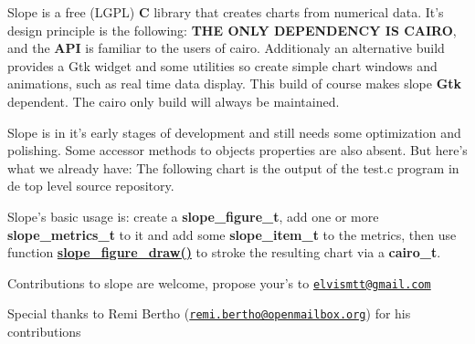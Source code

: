 Slope is a free (L\+G\+P\+L) {\bfseries C} library that creates charts from numerical data. It's design principle is the following\+: {\bfseries T\+H\+E O\+N\+L\+Y D\+E\+P\+E\+N\+D\+E\+N\+C\+Y I\+S C\+A\+I\+R\+O}, and the {\bfseries A\+P\+I} is familiar to the users of cairo. Additionaly an alternative build provides a Gtk widget and some utilities so create simple chart windows and animations, such as real time data display. This build of course makes slope {\bfseries Gtk} dependent. The cairo only build will always be maintained.

Slope is in it's early stages of development and still needs some optimization and polishing. Some accessor methods to objects properties are also absent. But here's what we already have\+: The following chart is the output of the test.\+c program in de top level source repository.



Slope's basic usage is\+: create a {\bfseries slope\+\_\+figure\+\_\+t}, add one or more {\bfseries slope\+\_\+metrics\+\_\+t} to it and add some {\bfseries slope\+\_\+item\+\_\+t} to the metrics, then use function {\bfseries \hyperlink{group__Figure_ga386e261642ba2b0fdc39a550e3e94462}{slope\+\_\+figure\+\_\+draw()}} to stroke the resulting chart via a {\bfseries cairo\+\_\+t}.

Contributions to slope are welcome, propose your's to \href{mailto:elvismtt@gmail.com}{\tt elvismtt@gmail.\+com}

Special thanks to Remi Bertho (\href{mailto:remi.bertho@openmailbox.org}{\tt remi.\+bertho@openmailbox.\+org}) for his contributions 